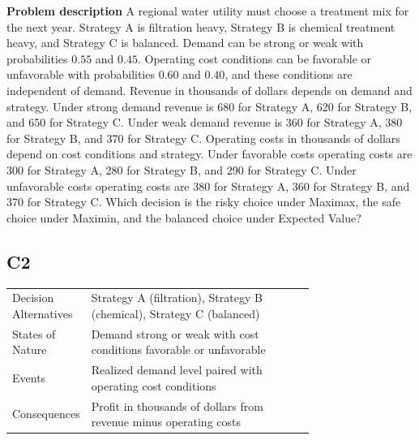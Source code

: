 \begin{ExamProblems}
		\item
		\textbf{Problem description}
		A regional water utility must choose a treatment mix for the next year. Strategy A is filtration heavy, Strategy B is chemical treatment heavy, and Strategy C is balanced. Demand can be strong or weak with probabilities $0.55$ and $0.45$. Operating cost conditions can be favorable or unfavorable with probabilities $0.60$ and $0.40$, and these conditions are independent of demand. Revenue in thousands of dollars depends on demand and strategy. Under strong demand revenue is 680 for Strategy A, 620 for Strategy B, and 650 for Strategy C. Under weak demand revenue is 360 for Strategy A, 380 for Strategy B, and 370 for Strategy C. Operating costs in thousands of dollars depend on cost conditions and strategy. Under favorable costs operating costs are 300 for Strategy A, 280 for Strategy B, and 290 for Strategy C. Under unfavorable costs operating costs are 380 for Strategy A, 360 for Strategy B, and 370 for Strategy C. Which decision is the risky choice under Maximax, the safe choice under Maximin, and the balanced choice under Expected Value?

		\subsection*{C2}
		\begin{center}
			\begin{tabular}{l p{0.74\linewidth}}
				\toprule
				Decision Alternatives & Strategy A (filtration), Strategy B (chemical), Strategy C (balanced) \\
				States of Nature & Demand strong or weak with cost conditions favorable or unfavorable \\
				Events & Realized demand level paired with operating cost conditions \\
				Consequences & Profit in thousands of dollars from revenue minus operating costs \\
				\bottomrule
			\end{tabular}
		\end{center}


\end{ExamProblems}

